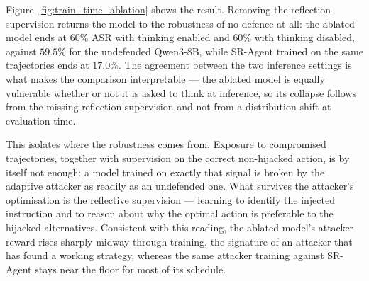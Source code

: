 Figure~\ref{fig:train_time_ablation} shows the result. Removing the reflection supervision returns the model to the
robustness of no defence at all: the ablated model ends at $60\%$ ASR with thinking enabled and $60\%$ with thinking
disabled, against $59.5\%$ for the undefended Qwen3-8B, while SR-Agent trained on the same trajectories ends at
$17.0\%$. The agreement between the two inference settings is what makes the comparison interpretable --- the ablated
model is equally vulnerable whether or not it is asked to think at inference, so its collapse follows from the missing
reflection supervision and not from a distribution shift at evaluation time.

This isolates where the robustness comes from. Exposure to compromised trajectories, together with supervision on the
correct non-hijacked action, is by itself not enough: a model trained on exactly that signal is broken by the adaptive
attacker as readily as an undefended one. What survives the attacker's optimisation is the reflective supervision ---
learning to identify the injected instruction and to reason about why the optimal action is preferable to the hijacked
alternatives. Consistent with this reading, the ablated model's attacker reward rises sharply midway through training,
the signature of an attacker that has found a working strategy, whereas the same attacker training against SR-Agent
stays near the floor for most of its schedule.
